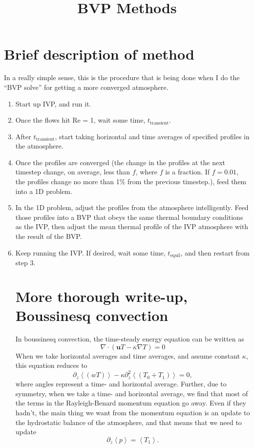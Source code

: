 \documentclass[aps, pre, onecolumn, nofootinbib, notitlepage, groupedaddress, amsfonts, amssymb, amsmath, longbibliography]{revtex4-1}
\newcommand{\Div}[1]{\ensuremath{\nabla\cdot\left( #1\right)}}
\newcommand{\angles}[1]{\ensuremath{\left\langle #1 \right\rangle}}
\newcommand{\grad}{\ensuremath{\nabla}}
\begin{document}
\title{BVP Methods}

\maketitle


\section{Brief description of method}
In a really simple sense, this is the procedure that is being done when I do the
``BVP solve'' for getting a more converged atmosphere.
\begin{enumerate}
\item Start up IVP, and run it.
\item Once the flows hit Re = 1, wait some time, $t_{\text{transient}}$.
\item After $t_{\text{transient}}$, start taking horizontal and time averages of
specified profiles in the atmosphere.
\item Once the profiles are converged (the change in the profiles at the next timestep
change, on average, less than $f$, where $f$ is a fraction.  If $f=0.01$, the profiles
change no more than 1\% from the previous timestep.), feed them into a 1D problem. 
\item In the 1D problem, adjust the profiles from the atmosphere intelligently.  Feed
those profiles into a BVP that obeys the same thermal boundary conditions as the IVP,
then adjust the mean thermal profile of the IVP atmosphere with the result of the BVP.
\item Keep running the IVP.  If desired, wait some time, $t_{\text{equil}}$, and then restart
from step 3.

\section{More thorough write-up, Boussinesq convection}
In boussinesq convection, the time-steady energy equation can be written as
$$
\Div{ \bm{u} T - \kappa \grad T} = 0
$$
When we take horizontal averages and time averages, and assume constant $\kappa$,
this equation reduces to
$$
\partial_z \angles{(w T)} - \kappa \partial^2_z \angles{(T_0 + T_1)} = 0,
$$
where angles represent a time- and horizontal average.  Further, due to symmetry,
when we take a time- and horizontal average, we find that most of the terms in the 
Rayleigh-Benard momentum equation go away.  Even if they hadn't, the main thing we want
from the momentum equation is an update to the hydrostatic balance of the atmosphere, and
that means that we need to update
$$
\partial_z \angles{p} = \angles{T_1}.
$$


\end{enumerate}
\end{document}
